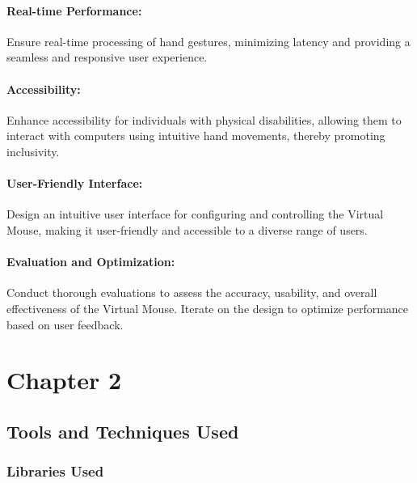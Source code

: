 \documentclass[12pt,a4paper]{report}
\begin{document}
  
\subsubsection{{Real-time Performance:}}Ensure real-time processing of hand gestures, minimizing latency and providing a seamless and responsive user experience. \cite{r8}


\subsubsection{{Accessibility:}}Enhance accessibility for individuals with physical disabilities, allowing them to interact with computers using intuitive hand movements, thereby promoting inclusivity. \cite{r9}

\subsubsection{User-Friendly Interface: }Design an intuitive user interface for configuring and controlling the Virtual Mouse, making it user-friendly and accessible to a diverse range of users. \cite{r2}

 

\subsubsection{Evaluation and Optimization:}Conduct thorough evaluations to assess the accuracy, usability, and overall effectiveness of the Virtual Mouse. Iterate on the design to optimize performance based on user feedback. \cite{r1}



	{\vfill \chapter*{\centering \vfill Chapter 2 \vfill}\vfill}
	\thispagestyle{empty}
	\newpage
	\label{Tools and Techniques Used}
	\section{Tools and Techniques Used}
	\label{Libraries Used}
		\subsection{Libraries Used}
		\label{MediaPipe}
		\vspace{0.5cm}
\end{document}
